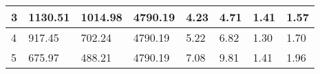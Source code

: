 \begin{table}
{\begin{tabular}{|l|l|l|l|l|l|l|l|}
3                                                                                     & 1130.51                                                                                                           & 1014.98                                                                                                              & 4790.19                                                                                                                           & 4.23                                                                                                & 4.71                                                                                                 & 1.41                                                                                          & 1.57                                                                                            \\ \hline
4                                                                                     & 917.45                                                                                                            & 702.24                                                                                                               & 4790.19                                                                                                                           & 5.22                                                                                               & 6.82                                                                                                 & 1.30                                                                                          & 1.70                                                                                            \\ \hline
5                                                                                     & 675.97                                                                                                           & 488.21                                                                                                               & 4790.19                                                                                                                           & 7.08                                                                                               & 9.81                                                                                                 & 1.41                                                                                          & 1.96                                                                                            \\ \hline

\end{tabular}}
\end{table}
